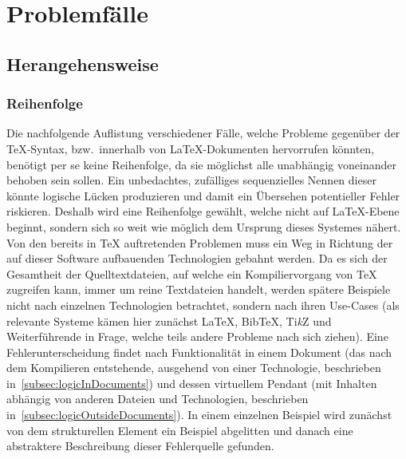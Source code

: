 \section{Problemfälle}
\subsection{Herangehensweise}
\subsubsection*{Reihenfolge}
Die nachfolgende Auflistung verschiedener Fälle, welche Probleme gegenüber der \TeX{}-Syntax, bzw.\ innerhalb von \LaTeX{}-Dokumenten hervorrufen könnten, benötigt per se keine Reihenfolge, da sie möglichst alle unabhängig voneinander behoben sein sollen. Ein unbedachtes, zufälliges sequenzielles Nennen dieser könnte logische Lücken produzieren und damit ein Übersehen potentieller Fehler riskieren. 
Deshalb wird eine Reihenfolge gewählt, welche nicht auf \LaTeX{}-Ebene beginnt, sondern sich so weit wie möglich dem Ursprung dieses Systemes nähert.
Von den bereits in \TeX{} auftretenden Problemen muss ein Weg in Richtung der auf dieser Software aufbauenden Technologien gebahnt werden. Da es sich der Gesamtheit der Quelltextdateien, auf welche ein Kompiliervorgang von \TeX{} zugreifen kann, immer um reine Textdateien handelt, werden spätere Beispiele nicht nach einzelnen Technologien betrachtet, sondern nach ihren Use-Cases (als relevante Systeme kämen hier zunächst \LaTeX{}, Bib\TeX{}, Ti\textit{k}Z und Weiterführende in Frage, welche teils andere Probleme nach sich ziehen). Eine Fehlerunterscheidung findet nach Funktionalität in einem Dokument (das nach dem Kompilieren entstehende, ausgehend von einer Technologie, beschrieben in~\ref{subsec:logicInDocuments}) und dessen virtuellem Pendant (mit Inhalten abhängig von anderen Dateien und Technologien, beschrieben in~\ref{subsec:logicOutsideDocuments}).%
In einem einzelnen Beispiel wird zunächst von dem strukturellen Element ein Beispiel abgelitten und danach eine abstraktere Beschreibung dieser Fehlerquelle gefunden.%
